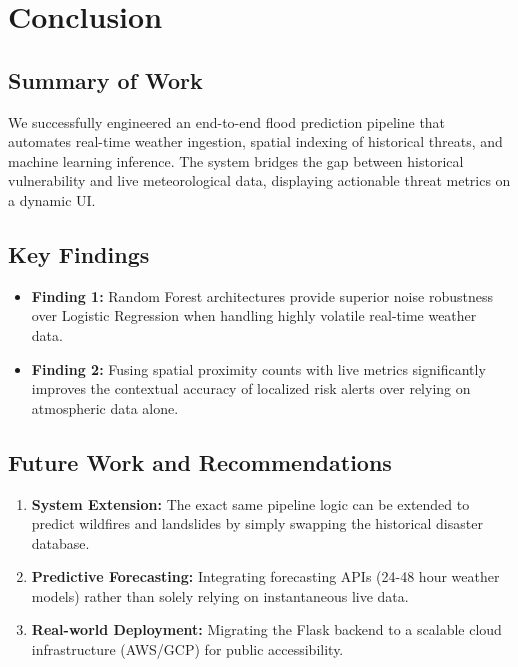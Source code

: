\documentclass[12pt,a4paper]{report}
\begin{document}
\chapter{Conclusion}

\section{Summary of Work}
We successfully engineered an end-to-end flood prediction pipeline that automates real-time weather ingestion, spatial indexing of historical threats, and machine learning inference. The system bridges the gap between historical vulnerability and live meteorological data, displaying actionable threat metrics on a dynamic UI.

\section{Key Findings}
\begin{itemize}
    \item \textbf{Finding 1:} Random Forest architectures provide superior noise robustness over Logistic Regression when handling highly volatile real-time weather data.
    \item \textbf{Finding 2:} Fusing spatial proximity counts with live metrics significantly improves the contextual accuracy of localized risk alerts over relying on atmospheric data alone.
\end{itemize}

\section{Future Work and Recommendations}
\begin{enumerate}
    \item \textbf{System Extension:} The exact same pipeline logic can be extended to predict wildfires and landslides by simply swapping the historical disaster database.
    \item \textbf{Predictive Forecasting:} Integrating forecasting APIs (24-48 hour weather models) rather than solely relying on instantaneous live data.
    \item \textbf{Real-world Deployment:} Migrating the Flask backend to a scalable cloud infrastructure (AWS/GCP) for public accessibility.
\end{enumerate}
\end{document}
